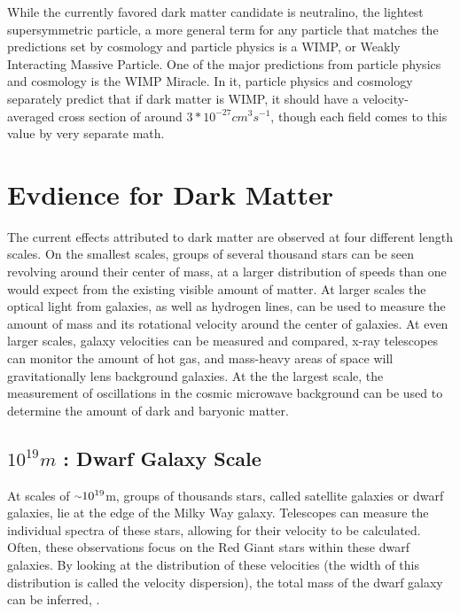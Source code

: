 While the currently favored dark matter candidate is neutralino, the lightest supersymmetric particle, a more general term for any particle that matches the predictions set by cosmology and particle physics is a WIMP, or Weakly Interacting Massive Particle.
One of the major predictions from particle physics and cosmology is the WIMP Miracle.
In it, particle physics and cosmology separately predict that if dark matter is WIMP, it should have a velocity-averaged cross section of around $3*10^{-27}cm^{3}s^{-1}$, though each field comes to this value by very separate math.


\section{Evdience for Dark Matter}

The current effects attributed to dark matter are observed at four different length scales.
On the smallest scales, groups of several thousand stars can be seen revolving around their center of mass, at a larger distribution of speeds than one would expect from the existing visible amount of matter.
At larger scales the optical light from galaxies, as well as hydrogen lines, can be used to measure the amount of mass and its rotational velocity around the center of galaxies.
At even larger scales, galaxy velocities can be measured and compared, x-ray telescopes can monitor the amount of hot gas, and mass-heavy areas of space will gravitationally lens background galaxies.
At the the largest scale, the measurement of oscillations in the cosmic microwave background can be used to determine the amount of dark and baryonic matter.

\subsection{$10^{19}m$ : Dwarf Galaxy Scale}
At scales of $\nicetilde 10^{19}$m, groups of thousands stars, called satellite galaxies or dwarf galaxies, lie at the edge of the Milky Way galaxy.
Telescopes can measure the individual spectra of these stars, allowing for their velocity to be calculated.
Often, these observations focus on the Red Giant stars within these dwarf galaxies\cite{dwarf_gal_red_giant}.
By looking at the distribution of these velocities (the width of this distribution is called the velocity dispersion), the total mass of the dwarf galaxy can be inferred\cite{dwarf_gal_vel_dispersion}, \cite{dwarf_gal_vel_dispersion2}.

